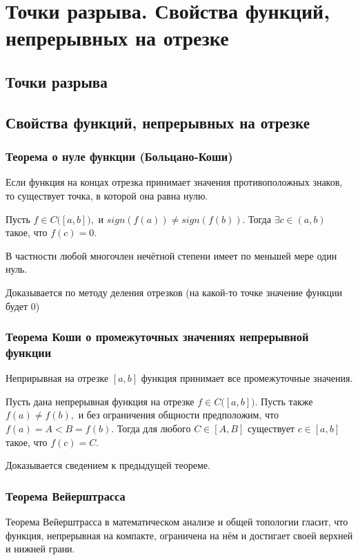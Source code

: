 \section{Точки разрыва. Свойства функций, непрерывных на отрезке}

\subsection{Точки разрыва}

\subsection{Свойства функций, непрерывных на отрезке}

\subsubsection{Теорема о нуле функции (Больцано-Коши)}

Если функция на концах отрезка принимает значения противоположных знаков, то существует точка, в которой она равна нулю.

Пусть $f\in C\bigl([a,b]\bigr),$ и $sign(f(a))\ne sign(f(b)).$ Тогда $\exists c \in (a,b)$ такое, что $f(c) = 0.$

В частности любой многочлен нечётной степени имеет по меньшей мере один нуль.

Доказывается по методу деления отрезков (на какой-то точке значение функции будет 0)

\subsubsection{Теорема Коши о промежуточных значениях непрерывной функции }

Неприрывная на отрезке $ [a,b] $ функция принимает все промежуточные значения.

Пусть дана непрерывная функция на отрезке $f\in C\bigl([a,b]\bigr).$ Пусть также $f(a) \neq f(b),$ и без ограничения общности предположим, что $f(a) = A < B = f(b).$ Тогда для любого $C \in [A,B]$ существует $c\in [a,b]$ такое, что $f(c)=C$.

Доказывается сведением к предыдущей теореме.

\subsubsection{Теорема Вейерштрасса}

Теорема Вейерштрасса в математическом анализе и общей топологии гласит, что функция, непрерывная на компакте, ограничена на нём и достигает своей верхней и нижней грани.

